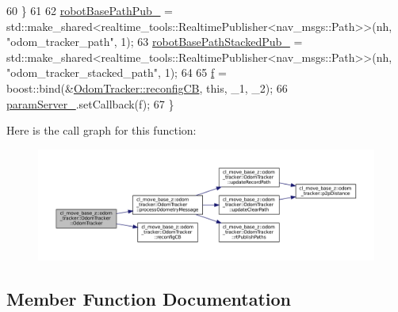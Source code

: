\begin{DoxyCode}
60             \}
61 
62             \hyperlink{classcl__move__base__z_1_1odom__tracker_1_1OdomTracker_a40a7cbb6bb6595e250e7c685c781613b}{robotBasePathPub\_} = 
      std::make\_shared<realtime\_tools::RealtimePublisher<nav\_msgs::Path>>(nh, \textcolor{stringliteral}{"odom\_tracker\_path"}, 1);
63             \hyperlink{classcl__move__base__z_1_1odom__tracker_1_1OdomTracker_a7a2fb23e835ba7d63e69c8db819be876}{robotBasePathStackedPub\_} = 
      std::make\_shared<realtime\_tools::RealtimePublisher<nav\_msgs::Path>>(nh, \textcolor{stringliteral}{"odom\_tracker\_stacked\_path"}, 1);
64 
65             \hyperlink{classcl__move__base__z_1_1odom__tracker_1_1OdomTracker_a391e33cf5482697b32665fcc7c4d87e4}{f} = boost::bind(&\hyperlink{classcl__move__base__z_1_1odom__tracker_1_1OdomTracker_adb06a17455b8d545034d8845706e2886}{OdomTracker::reconfigCB}, \textcolor{keyword}{this}, \_1, \_2);
66             \hyperlink{classcl__move__base__z_1_1odom__tracker_1_1OdomTracker_a8bee0a1a49b5f736a7d7a741e56f7b02}{paramServer\_}.setCallback(f);
67         \}
\end{DoxyCode}
Here is the call graph for this function\+:
\nopagebreak
\begin{figure}[H]
\begin{center}
\leavevmode
\includegraphics[width=350pt]{classcl__move__base__z_1_1odom__tracker_1_1OdomTracker_a99e1f405d0b3ec3e9fc73e666793c409_cgraph}
\end{center}
\end{figure}


\subsection{Member Function Documentation}
\mbox{\label{classcl__move__base__z_1_1odom__tracker_1_1OdomTracker_a93a14e15e3e623f530e056f403bf7644}} 
